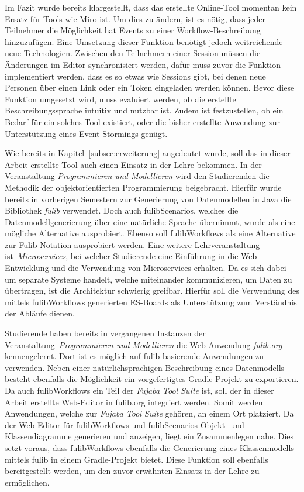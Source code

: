 Im Fazit wurde bereits klargestellt, dass das erstellte Online-Tool momentan kein Ersatz für Tools wie Miro ist.
Um dies zu ändern, ist es nötig, dass jeder Teilnehmer die Möglichkeit hat Events zu einer Workflow-Beschreibung hinzuzufügen.
Eine Umsetzung dieser Funktion benötigt jedoch weitreichende neue Technologien.
Zwischen den Teilnehmern einer Session müssen die Änderungen im Editor synchronisiert werden, dafür muss zuvor die Funktion
implementiert werden, dass es so etwas wie Sessions gibt, bei denen neue Personen über einen Link oder ein Token eingeladen werden können.
Bevor diese Funktion umgesetzt wird, muss evaluiert werden, ob die erstellte Beschreibungssprache intuitiv und nutzbar ist.
Zudem ist festzustellen, ob ein Bedarf für ein solches Tool existiert, oder die bisher erstellte Anwendung zur Unterstützung eines Event Stormings genügt.

Wie bereits in Kapitel~\ref{subsec:erweiterung} angedeutet wurde, soll das in dieser Arbeit erstellte Tool auch einen Einsatz in der Lehre bekommen.
In der Veranstaltung \textit{Programmieren und Modellieren} wird den Studierenden die Methodik der objektorientierten Programmierung beigebracht.
Hierfür wurde bereits in vorherigen Semestern zur Generierung von Datenmodellen in Java die Bibliothek \textit{fulib} verwendet.
Doch auch fulibScenarios, welches die Datenmodellgenerierung über eine natürliche Sprache übernimmt, wurde als eine mögliche Alternative ausprobiert.
Ebenso soll fulibWorkflows als eine Alternative zur Fulib-Notation ausprobiert werden.
Eine weitere Lehrveranstaltung ist~\textit{Microservices}, bei welcher Studierende eine Einführung in die Web-Entwicklung und die Verwendung von
Microservices erhalten.
Da es sich dabei um separate Systeme handelt, welche miteinander kommunizieren, um Daten zu übertragen, ist die Architektur schwierig greifbar.
Hierfür soll die Verwendung des mittels fulibWorkflows generierten \ac{ES}-Boards als Unterstützung zum Verständnis der Abläufe dienen.

Studierende haben bereits in vergangenen Instanzen der Veranstaltung~\textit{Programmieren und Modellieren} die Web-Anwendung \textit{fulib.org} kennengelernt.
Dort ist es möglich auf fulib basierende Anwendungen zu verwenden.
Neben einer natürlichsprachigen Beschreibung eines Datenmodells besteht ebenfalls die Möglichkeit ein vorgefertigtes Gradle-Projekt zu exportieren.
Da auch fulibWorkflows ein Teil der \textit{Fujaba Tool Suite} ist, soll der in dieser Arbeit erstellte Web-Editor in fulib.org integriert werden.
Somit werden Anwendungen, welche zur \textit{Fujaba Tool Suite} gehören, an einem Ort platziert.
Da der Web-Editor für fulibWorkflows und fulibScenarios Objekt- und Klassendiagramme generieren und anzeigen, liegt ein Zusammenlegen nahe.
Dies setzt voraus, dass fulibWorkflows ebenfalls die Generierung eines Klassenmodells mittels fulib in einem Gradle-Projekt bietet.
Diese Funktion soll ebenfalls bereitgestellt werden, um den zuvor erwähnten Einsatz in der Lehre zu ermöglichen.
